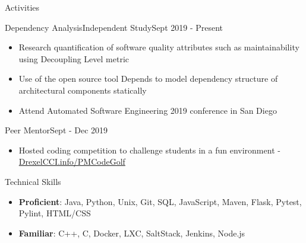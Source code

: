 \documentclass[]{mcdowellcv}
\begin{document}
	\begin{cvsection}{Activities}
		\begin{cvsubsection}{Dependency Analysis}{Independent Study}{Sept 2019 - Present}	
			\begin{itemize}
				\item Research quantification of software quality attributes such as maintainability using Decoupling Level metric
				\item Use of the open source tool Depends to model dependency structure of architectural components statically
				\item Attend Automated Software Engineering 2019 conference in San Diego
			\end{itemize}
		\end{cvsubsection}
		\begin{cvsubsection}{Peer Mentor}{}{Sept - Dec 2019}	
			\begin{itemize}
				\item Hosted coding competition to challenge students in a fun environment - \url{DrexelCCI.info/PMCodeGolf}
			\end{itemize}
		\end{cvsubsection}
	\end{cvsection}
	
	\begin{cvsection}{Technical Skills}
		\begin{cvsubsection}{}{}{}	
		    \begin{itemize}
				\item \textbf{Proficient}: Java, Python, Unix, Git, SQL, JavaScript, Maven, Flask, Pytest, Pylint, HTML/CSS
				\item \textbf{Familiar}: C++, C, Docker, LXC, SaltStack, Jenkins, Node.js
			\end{itemize}
		\end{cvsubsection}
	\end{cvsection}
\end{document}
